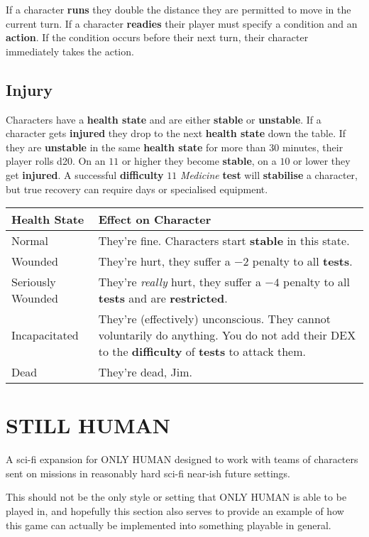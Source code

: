 \documentclass[11pt]{article}
\begin{document}
\begin{multicols}{3}
  If a character \textbf{runs} they double the distance they are permitted to move in the current turn. If a character \textbf{readies} their player must specify a condition and an \textbf{action}. If the condition occurs before their next turn, their character immediately takes the action.

  \subsection*{Injury}

  Characters have a \textbf{health state} and are either \textbf{stable} or \textbf{unstable}. If a character gets \textbf{injured} they drop to the next \textbf{health state} down the table. If they are \textbf{unstable} in the same \textbf{health state} for more than $30$ minutes, their player rolls d20. On an $11$ or higher they become \textbf{stable}, on a $10$ or lower they get \textbf{injured}. A successful \textbf{difficulty} $11$ \textit{Medicine} \textbf{test} will \textbf{stabilise} a character, but true recovery can require days or specialised equipment.

  \begin{tabularx}{\linewidth}{lX}
    Health State & Effect on Character \\
    \hline
    Normal & They're fine. Characters start \textbf{stable} in this state. \\
    Wounded & They're hurt, they suffer a $-2$ penalty to all \textbf{tests}. \\
    Seriously Wounded & They're \textit{really} hurt, they suffer a $-4$ penalty to all \textbf{tests} and are \textbf{restricted}. \\
    Incapacitated & They're (effectively) unconscious. They cannot voluntarily do anything. You do not add their DEX to the \textbf{difficulty} of \textbf{tests} to attack them. \\
    Dead & They're dead, Jim.
  \end{tabularx}

  \section*{STILL HUMAN}

  A sci-fi expansion for ONLY HUMAN designed to work with teams of characters sent on missions in reasonably hard sci-fi near-ish future settings.

  This should not be the only style or setting that ONLY HUMAN is able to be played in, and hopefully this section also serves to provide an example of how this game can actually be implemented into something playable in general.


\end{multicols}
\end{document}
